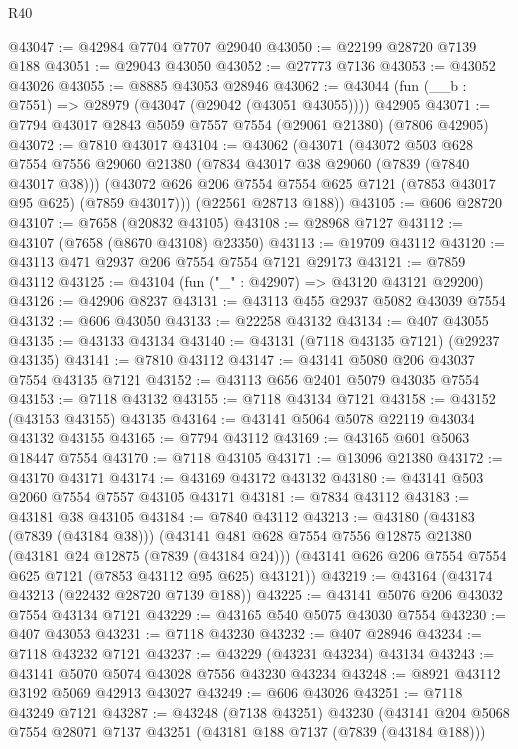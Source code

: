 \begin{lexlean}{R40}
\begin{coremodule}
@43047 := @42984 @7704 @7707 @29040
@43050 := @22199 @28720 @7139 @188
@43051 := @29043 @43050
@43052 := @27773 @7136
@43053 := @43052 @43026
@43055 := @8885 @43053 @28946
@43062 := @43044 (fun (__b : @7551) => @28979 (@43047 (@29042 (@43051 @43055)))) @42905
@43071 := @7794 @43017 @2843 @5059 @7557 @7554 (@29061 @21380) (@7806 @42905)
@43072 := @7810 @43017
@43104 := @43062
    (@43071
      (@43072
        @503
        @628
        @7554
        @7556
        @29060
        @21380
        (@7834 @43017 @38 @29060 (@7839 (@7840 @43017 @38)))
        (@43072 @626 @206 @7554 @7554 @625 @7121 (@7853 @43017 @95 @625) (@7859 @43017)))
      (@22561 @28713 @188))
@43105 := @606 @28720
@43107 := @7658 (@20832 @43105)
@43108 := @28968 @7127
@43112 := @43107 (@7658 (@8670 @43108) @23350)
@43113 := @19709 @43112
@43120 := @43113 @471 @2937 @206 @7554 @7554 @7121 @29173
@43121 := @7859 @43112
@43125 := @43104 (fun ("_" : @42907) => @43120 @43121 @29200)
@43126 := @42906 @8237
@43131 := @43113 @455 @2937 @5082 @43039 @7554
@43132 := @606 @43050
@43133 := @22258 @43132
@43134 := @407 @43055
@43135 := @43133 @43134
@43140 := @43131 (@7118 @43135 @7121) (@29237 @43135)
@43141 := @7810 @43112
@43147 := @43141 @5080 @206 @43037 @7554 @43135 @7121
@43152 := @43113 @656 @2401 @5079 @43035 @7554
@43153 := @7118 @43132
@43155 := @7118 @43134 @7121
@43158 := @43152 (@43153 @43155) @43135
@43164 := @43141 @5064 @5078 @22119 @43034 @43132 @43155
@43165 := @7794 @43112
@43169 := @43165 @601 @5063 @18447 @7554
@43170 := @7118 @43105
@43171 := @13096 @21380
@43172 := @43170 @43171
@43174 := @43169 @43172 @43132
@43180 := @43141 @503 @2060 @7554 @7557 @43105 @43171
@43181 := @7834 @43112
@43183 := @43181 @38 @43105
@43184 := @7840 @43112
@43213 := @43180
    (@43183 (@7839 (@43184 @38)))
    (@43141
      @481
      @628
      @7554
      @7556
      @12875
      @21380
      (@43181 @24 @12875 (@7839 (@43184 @24)))
      (@43141 @626 @206 @7554 @7554 @625 @7121 (@7853 @43112 @95 @625) @43121))
@43219 := @43164 (@43174 @43213 (@22432 @28720 @7139 @188))
@43225 := @43141 @5076 @206 @43032 @7554 @43134 @7121
@43229 := @43165 @540 @5075 @43030 @7554
@43230 := @407 @43053
@43231 := @7118 @43230
@43232 := @407 @28946
@43234 := @7118 @43232 @7121
@43237 := @43229 (@43231 @43234) @43134
@43243 := @43141 @5070 @5074 @43028 @7556 @43230 @43234
@43248 := @8921 @43112 @3192 @5069 @42913 @43027
@43249 := @606 @43026
@43251 := @7118 @43249 @7121
@43287 := @43248
    (@7138 @43251)
    @43230
    (@43141
      @204
      @5068
      @7554
      @28071
      @7137
      @43251
      (@43181 @188 @7137 (@7839 (@43184 @188)))

\end{coremodule}
\end{lexlean}
